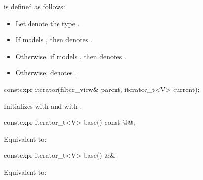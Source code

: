 \documentclass{wg21}
\begin{document}
\pnum
{} is defined as follows:
\begin{itemize}
\item Let  denote the type
.

\item If  models
,
then  denotes .

\item Otherwise, if   models
,
then  denotes .

\item Otherwise,  denotes .
\end{itemize}

%
\begin{itemdecl}
constexpr iterator(filter_view& parent, iterator_t<V> current);
\end{itemdecl}

\begin{itemdescr}
\pnum
\effects Initializes  with  and
 with .
\end{itemdescr}

%
\begin{itemdecl}
constexpr iterator_t<V> base() const @@;
\end{itemdecl}

\begin{itemdescr}
\pnum
\effects Equivalent to: 
\end{itemdescr}


\begin{addedblock}
%
\begin{itemdecl}
constexpr iterator_t<V> base() &&;
\end{itemdecl}

\begin{itemdescr}
\pnum
\effects Equivalent to: 
\end{itemdescr}
\end{addedblock}
\end{document}
